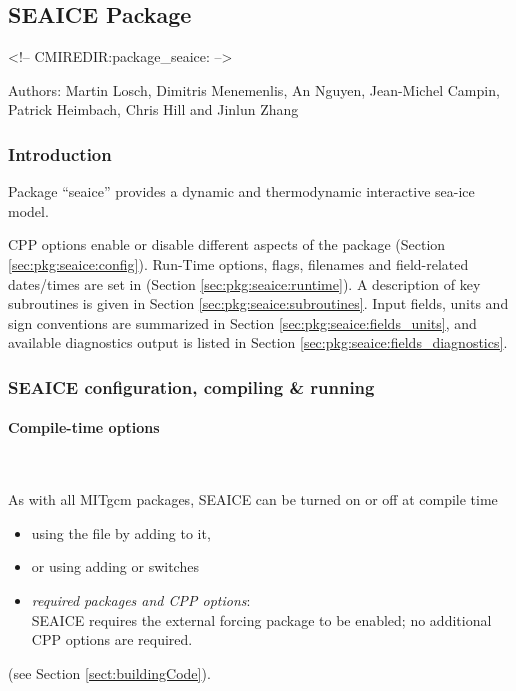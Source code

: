 


\subsection{SEAICE Package}
\label{sec:pkg:seaice}
\begin{rawhtml}
<!-- CMIREDIR:package_seaice: -->
\end{rawhtml}

Authors: Martin Losch, Dimitris Menemenlis, An Nguyen, Jean-Michel Campin,
Patrick Heimbach, Chris Hill and Jinlun Zhang

\subsubsection{Introduction
\label{sec:pkg:exf:intro}}


Package ``seaice'' provides a dynamic and thermodynamic interactive
sea-ice model. 

CPP options enable or disable different aspects of the package
(Section \ref{sec:pkg:seaice:config}).
Run-Time options, flags, filenames and field-related dates/times are
set in 
(Section \ref{sec:pkg:seaice:runtime}).
A description of key subroutines is given in Section
\ref{sec:pkg:seaice:subroutines}.
Input fields, units and sign conventions are summarized in
Section \ref{sec:pkg:seaice:fields_units}, and available diagnostics
output is listed in Section \ref{sec:pkg:seaice:fields_diagnostics}.


\subsubsection{SEAICE configuration, compiling \& running}

\paragraph{Compile-time options
\label{sec:pkg:seaice:config}}
~

As with all MITgcm packages, SEAICE can be turned on or off at compile time
%
\begin{itemize}
%
\item
using the  file by adding  to it,
%
\item
or using  adding
 or  switches
%
\item
\textit{required packages and CPP options}: \\
SEAICE requires the external forcing package  to be enabled;
no additional CPP options are required.
%
\end{itemize}
(see Section \ref{sect:buildingCode}).

